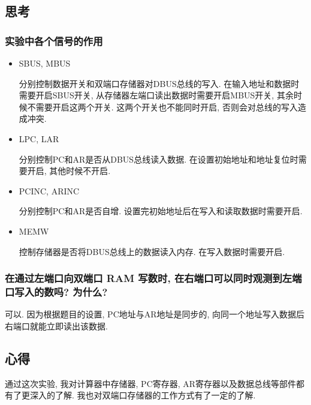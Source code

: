 \documentclass[../main.tex]{subfiles}
\begin{document}
\subsection{思考}

\subsubsection{实验中各个信号的作用}

\begin{itemize}

    \item SBUS, MBUS

          分别控制数据开关和双端口存储器对DBUS总线的写入. 在输入地址和数据时需要开启SBUS开关, 从存储器左端口读出数据时需要开启MBUS开关, 其余时候不需要开启这两个开关. 这两个开关也不能同时开启, 否则会对总线的写入造成冲突.

    \item LPC, LAR

          分别控制PC和AR是否从DBUS总线读入数据. 在设置初始地址和地址复位时需要开启, 其他时候不开启.

    \item PCINC, ARINC

          分别控制PC和AR是否自增. 设置完初始地址后在写入和读取数据时需要开启.

    \item MEMW

          控制存储器是否将DBUS总线上的数据读入内存. 在写入数据时需要开启.

\end{itemize}

\subsubsection{在通过左端口向双端口 RAM 写数时, 在右端口可以同时观测到左端口写入的数吗? 为什么?}

可以. 因为根据题目的设置, PC地址与AR地址是同步的, 向同一个地址写入数据后右端口就能立即读出该数据.

\subsection{心得}

通过这次实验, 我对计算器中存储器, PC寄存器, AR寄存器以及数据总线等部件都有了更深入的了解. 我也对双端口存储器的工作方式有了一定的了解.
\end{document}
